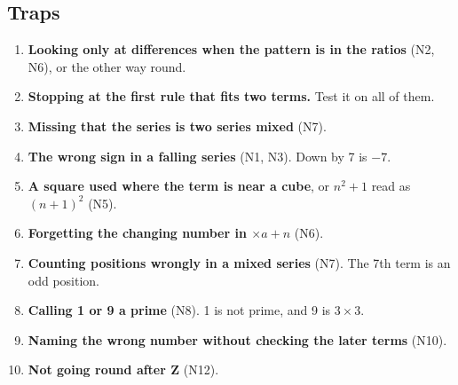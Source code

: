 \documentclass[11pt,a4paper]{article}
\let\oldsubsection\subsection
\renewcommand{\subsection}{\needspace{9\baselineskip}\oldsubsection}
\begin{document}
\subsection*{Traps}
\begin{enumerate}
\item \textbf{Looking only at differences when the pattern is in the ratios} (N2, N6), or the other way round.
\item \textbf{Stopping at the first rule that fits two terms.} Test it on all of them.
\item \textbf{Missing that the series is two series mixed} (N7).
\item \textbf{The wrong sign in a falling series} (N1, N3). Down by 7 is $-7$.
\item \textbf{A square used where the term is near a cube}, or $n^2+1$ read as $(n+1)^2$ (N5).
\item \textbf{Forgetting the changing number in $\times a + n$} (N6).
\item \textbf{Counting positions wrongly in a mixed series} (N7). The 7th term is an odd position.
\item \textbf{Calling 1 or 9 a prime} (N8). 1 is not prime, and 9 is $3\times3$.
\item \textbf{Naming the wrong number without checking the later terms} (N10).
\item \textbf{Not going round after Z} (N12).
\end{enumerate}
\end{document}
